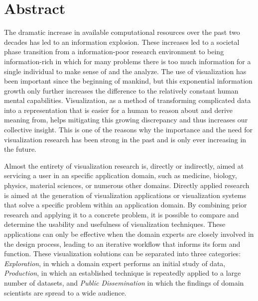 \chapter*{Abstract}

The dramatic increase in available computational resources over the past two decades has led to an information explosion.  These increases led to a societal phase transition from a information-poor research environment to being information-rich in which for many problems there is too much information for a single individual to make sense of and the analyze.  The use of visualization has been important since the beginning of mankind, but this exponential information growth only further increases the difference to the relatively constant human mental capabilities.  Visualization, as a method of transforming complicated data into a representation that is easier for a human to reason about and derive meaning from, helps mitigating this growing discrepancy and thus increases our collective insight.  This is one of the reasons why the importance and the need for visualization research has been strong in the past and is only ever increasing in the future.

Almost the entirety of visualization research is, directly or indirectly, aimed at servicing a user in an specific application domain, such as medicine, biology, physics, material sciences, or numerous other domains.  Directly applied research is aimed at the generation of visualization applications or visualization systems that solve a specific problem within an application domain.  By combining prior research and applying it to a concrete problem, it is possible to compare and determine the usability and usefulness of visualization techniques.  These applications can only be effective when the domain experts are closely involved in the design process, leading to an iterative workflow that informs its form and function.  These visualization solutions can be separated into three categories:  \emph{Exploration}, in which a domain expert performs an initial study of data, \emph{Production}, in which an established technique is repeatedly applied to a large number of datasets, and \emph{Public Dissemination} in which the findings of domain scientists are spread to a wide audience.

